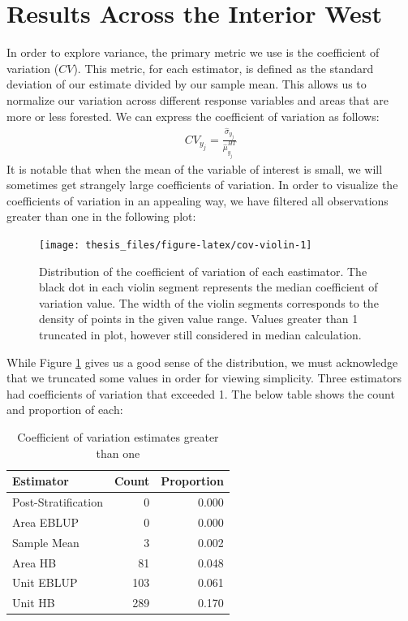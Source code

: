 \documentclass[12pt,twoside]{reedthesis}
\begin{document}
\hypertarget{results-across-the-interior-west}{%
\section{Results Across the Interior West}\label{results-across-the-interior-west}}

In order to explore variance, the primary metric we use is the coefficient of variation (\(CV\)). This metric, for each estimator, is defined as the standard deviation of our estimate divided by our sample mean. This allows us to normalize our variation across different response variables and areas that are more or less forested. We can express the coefficient of variation as follows:
\begin{align}
CV_{y_j} = \frac{\hat\sigma_{y_j}}{\hat\mu_{y_j}^{HT}}
\end{align}
It is notable that when the mean of the variable of interest is small, we will sometimes get strangely large coefficients of variation. In order to visualize the coefficients of variation in an appealing way, we have filtered all observations greater than one in the following plot:
\begin{figure}

{\centering \texttt{[image: thesis\_files/figure-latex/cov-violin-1]} 

}

\caption[Distribution of the coefficient of variation of each eastimator]{Distribution of the coefficient of variation of each eastimator. The black dot in each violin segment represents the median coefficient of variation value. The width of the violin segments corresponds to the density of points in the given value range. Values greater than 1 truncated in plot, however still considered in median calculation.}\label{fig:cov-violin}
\end{figure}
While Figure \ref{fig:cov-violin} gives us a good sense of the distribution, we must acknowledge that we truncated some values in order for viewing simplicity. Three estimators had coefficients of variation that exceeded 1. The below table shows the count and proportion of each:
\begin{longtable}[t]{lrr}
\caption{\label{tab:over-one}Coefficient of variation estimates greater than one}\\
\toprule
Estimator & Count & Proportion\\
\midrule
Post-Stratification & 0 & 0.000\\
Area EBLUP & 0 & 0.000\\
Sample Mean & 3 & 0.002\\
Area HB & 81 & 0.048\\
Unit EBLUP & 103 & 0.061\\
\addlinespace
Unit HB & 289 & 0.170\\
\bottomrule
\end{longtable}
\end{document}
